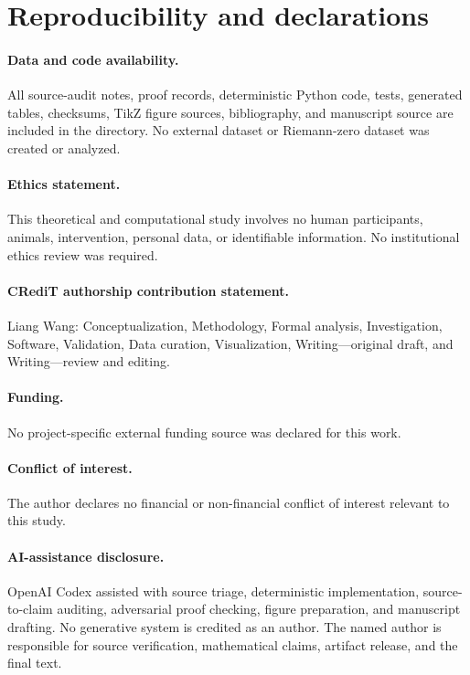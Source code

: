 \documentclass[11pt]{article}
\theoremstyle{definition}
\theoremstyle{remark}
\begin{document}
\section*{Reproducibility and declarations}

\paragraph{Data and code availability.}
All source-audit notes, proof records, deterministic Python code, tests,
generated tables, checksums, TikZ figure sources, bibliography, and manuscript
source are included in the  directory.  No external
dataset or Riemann-zero dataset was created or analyzed.

\paragraph{Ethics statement.}
This theoretical and computational study involves no human participants,
animals, intervention, personal data, or identifiable information.  No
institutional ethics review was required.

\paragraph{CRediT authorship contribution statement.}
Liang Wang: Conceptualization, Methodology, Formal analysis, Investigation,
Software, Validation, Data curation, Visualization, Writing---original draft,
and Writing---review and editing.

\paragraph{Funding.}
No project-specific external funding source was declared for this work.

\paragraph{Conflict of interest.}
The author declares no financial or non-financial conflict of interest
relevant to this study.

\paragraph{AI-assistance disclosure.}
OpenAI Codex assisted with source triage, deterministic implementation,
source-to-claim auditing, adversarial proof checking, figure preparation, and
manuscript drafting.  No generative system is credited as an author.  The
named author is responsible for source verification, mathematical claims,
artifact release, and the final text.
\end{document}
